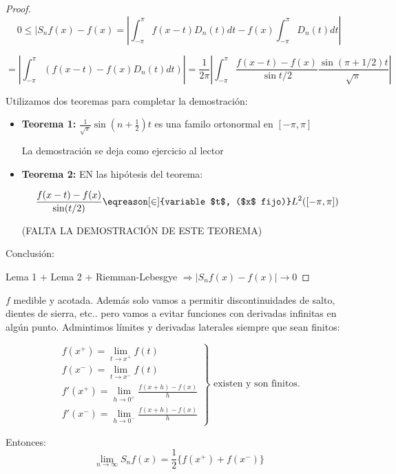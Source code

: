 	\begin{proof}

		\[ 0 \leq |S_nf(x) - f(x)  = \left| \int_{-\pi}^{\pi} f(x-t) D_n(t) dt - f(x) \int_{-\pi}^\pi D_n(t) dt \right|  \]

		\[= \left| \int_{-\pi}^\pi (f(x-t)-f(x) D_n(t) dt) \right| = \frac{1}{2\pi} \left| \int_{-\pi}^\pi \frac{f(x-t)-f(x)}{\sin t/2} \frac{\sin(\pi+1/2)t}{\sqrt{\pi}} \right|  \]

		Utilizamos dos teoremas para completar la demostración:

		\begin{itemize}

			\item \textbf{Teorema 1:} $\frac{1}{\sqrt{\pi}} \sin(n + \frac{1}{2}) t $ es una familo ortonormal en $[-\pi,\pi]$

			La demostración se deja como ejercicio al lector

			\item \textbf{Teorema 2:}  EN las hipótesis del teorema:

			\[ \frac{f(x-t)-f(x)}{\sin(t/2)} \eqreason[\in]{variable $t$, ($x$ fijo)} L^2 ([-\pi,\pi]) \]

			(FALTA LA DEMOSTRACIÓN DE ESTE TEOREMA)

		\end{itemize}

		Conclusión:

		Lema 1 + Lema 2 + Riemman-Lebesgye $\Rightarrow \left| S_n f(x) - f(x) \right| \rightarrow 0$

	\end{proof}

	\begin{theorem}[Dirichlet 2]

		$f$ medible y acotada. Además solo vamos a permitir discontinuidades de salto, dientes de sierra, etc.. pero vamos a evitar funciones con derivadas infinitas en algún punto. Admintimos límites y derivadas laterales siempre que sean finitos:


		\[
		\left.
		\begin{array}{l}
			f(x^+) = \lim_{t \to x^+} f(t) \\
			f(x^-) = \lim_{t \to x^-} f(t) \\
			f'(x^+) = \lim_{h \to 0^+} \frac{f(x+h)-f(x)}{h} \\
			f'(x^-) = \lim_{h \to 0^-} \frac{f(x+h)-f(x)}{h}
		\end{array} \right\} \text{ existen y son finitos.}
		\]

		Entonces: \[ \lim_{n \to \infty} S_nf(x) = \frac{1}{2} \{f(x^+)+f(x^-)\}\]

	\end{theorem}

